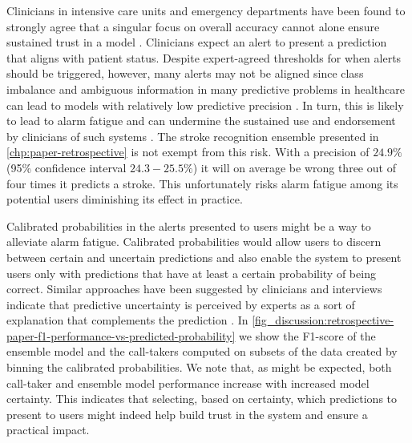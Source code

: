 Clinicians in intensive care units and emergency departments have been found to strongly agree that a singular focus on overall accuracy cannot alone ensure sustained trust in a model \cite{tonekaboni_what_2019}. Clinicians expect an alert to present a prediction that aligns with patient status. Despite expert-agreed thresholds for when alerts should be triggered, however, many alerts may not be aligned since class imbalance and ambiguous information in many predictive problems in healthcare can lead to models with relatively low predictive precision \parencite{umscheid_development_2015, cite14, cite15, wenstrup_retrospective_2023}. In turn, this is likely to lead to alarm fatigue \parencite{embi_evaluating_2012} and can undermine the sustained use and endorsement by clinicians of such systems \parencite{guidi_clinician_2015}. 
The stroke recognition ensemble presented in \cref{chp:paper-retrospective} is not exempt from this risk. With a precision of $24.9\%$ (95\% confidence interval $24.3-25.5\%$) it will on average be wrong three out of four times it predicts a stroke. This unfortunately risks alarm fatigue among its potential users diminishing its effect in practice.

Calibrated probabilities in the alerts presented to users might be a way to alleviate alarm fatigue. Calibrated probabilities would allow users to discern between certain and uncertain predictions and also enable the system to present users only with predictions that have at least a certain probability of being correct. Similar approaches have been suggested by clinicians and interviews indicate that predictive uncertainty is perceived by experts as a sort of explanation that complements the prediction \cite{tonekaboni_what_2019}. In \cref{fig_discussion:retrospective-paper-f1-performance-vs-predicted-probability} we show the F1-score of the ensemble model and the call-takers computed on subsets of the data created by binning the calibrated probabilities. We note that, as might be expected, both call-taker and ensemble model performance increase with increased model certainty. This indicates that selecting, based on certainty, which predictions to present to users might indeed help build trust in the system and ensure a practical impact. 


